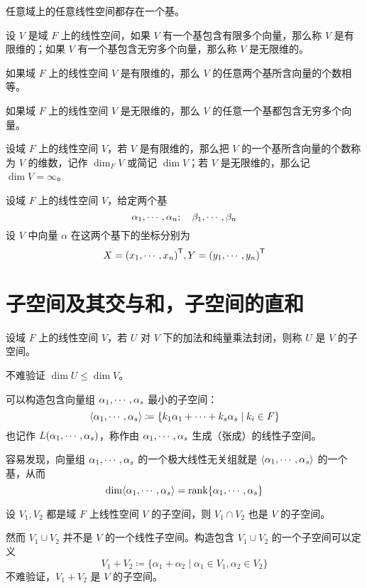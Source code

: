 \begin{theorem}
    任意域上的任意线性空间都存在一个基。
\end{theorem}

\begin{definition}
    设 $V$ 是域 $F$ 上的线性空间，如果 $V$ 有一个基包含有限多个向量，那么称 $V$ 是有限维的；如果 $V$ 有一个基包含无穷多个向量，那么称 $V$ 是无限维的。
\end{definition}

如果域 $F$ 上的线性空间 $V$ 是有限维的，那么 $V$ 的任意两个基所含向量的个数相等。

如果域 $F$ 上的线性空间 $V$ 是无限维的，那么 $V$ 的任意一个基都包含无穷多个向量。

\begin{definition}
    设域 $F$ 上的线性空间 $V$，若 $V$ 是有限维的，那么把 $V$ 的一个基所含向量的个数称为 $V$ 的维数，记作 $\dim_{F} V$ 或简记 $\dim V$；若 $V$ 是无限维的，那么记 $\dim V = \infty$。
\end{definition}

设域 $F$ 上的线性空间 $V$，给定两个基
\[ \alpha_1,\cdots,\alpha_n; \quad \beta_1,\cdots,\beta_n \]
设 $V$ 中向量 $\alpha$ 在这两个基下的坐标分别为
\[ X = {(x_1,\cdots,x_n)}^\mathsf{T}, Y = {(y_1,\cdots,y_n)}^\mathsf{T} \]

\section{子空间及其交与和，子空间的直和}

设域 $F$ 上的线性空间 $V$，若 $U$ 对 $V$ 下的加法和纯量乘法封闭，则称 $U$ 是 $V$ 的子空间。

不难验证 $\dim U \leqslant \dim V$。

可以构造包含向量组 $\alpha_1,\cdots,\alpha_s$ 最小的子空间：
\[ \langle \alpha_1,\cdots,\alpha_s \rangle \coloneqq \{ k_1\alpha_1+\cdots+k_s\alpha_s \mid k_i\in F \} \]
也记作 $L(\alpha_1,\cdots,\alpha_s)$，称作由 $\alpha_1,\cdots,\alpha_s$ 生成（张成）的线性子空间。

容易发现，向量组 $\alpha_1,\cdots,\alpha_s$ 的一个极大线性无关组就是 $\langle \alpha_1,\cdots,\alpha_s \rangle$ 的一个基，从而
\[ \dim \langle \alpha_1,\cdots,\alpha_s \rangle = \operatorname{rank} \{ \alpha_1,\cdots,\alpha_s \}\]

\begin{theorem}
    设 $V_1,V_2$ 都是域 $F$ 上线性空间 $V$ 的子空间，则 $V_1 \cap V_2$ 也是 $V$ 的子空间。
\end{theorem}

然而 $V_1 \cup V_2$ 并不是 $V$ 的一个线性子空间。构造包含 $V_1 \cup V_2$ 的一个子空间可以定义
\[ V_1+V_2 \coloneqq \{ \alpha_1+\alpha_2 \mid \alpha_1\in V_1, \alpha_2\in V_2 \} \]
不难验证，$V_1+V_2$ 是 $V$ 的子空间。

